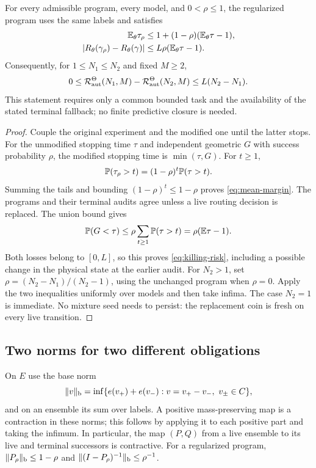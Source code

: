 \begin{lemma}\label{lem:margin}
For every admissible program, every model, and $0<\rho\le1$, the regularized program uses the same labels and satisfies
\begin{align}
 \mathbb E_\theta\tau_\rho
 &\le1+(1-\rho)(\mathbb E_\theta\tau-1),\label{eq:mean-margin}\\
 |R_\theta(\gamma_\rho)-R_\theta(\gamma)|
 &\le L\rho(\mathbb E_\theta\tau-1).\label{eq:killing-risk}
\end{align}
Consequently, for $1\le N_1\le N_2$ and fixed $M\ge2$,
\begin{equation}\label{eq:budget-lipschitz}
 0\le\mathcal R_{\mathrm{aut}}^\Theta(N_1,M)-\mathcal R_{\mathrm{aut}}^\Theta(N_2,M)
       \le L(N_2-N_1).
\end{equation}
This statement requires only a common bounded task and the availability of the stated terminal fallback; no finite predictive closure is needed.
\end{lemma}
\begin{proof}
Couple the original experiment and the modified one until the latter stops. For the unmodified stopping time $\tau$ and independent geometric $G$ with success probability $\rho$, the modified stopping time is $\min(\tau,G)$. For $t\ge1$,
\[
 \mathbb P(\tau_\rho>t)=(1-\rho)^t\mathbb P(\tau>t).
\]
Summing the tails and bounding $(1-\rho)^t\le1-\rho$ proves \eqref{eq:mean-margin}. The programs and their terminal audits agree unless a live routing decision is replaced. The union bound gives
\[
 \mathbb P(G<\tau)\le\rho\sum_{t\ge1}\mathbb P(\tau>t)
                  =\rho(\mathbb E\tau-1).
\]
Both losses belong to $[0,L]$, so this proves \eqref{eq:killing-risk}, including a possible change in the physical state at the earlier audit. For $N_2>1$, set $\rho=(N_2-N_1)/(N_2-1)$, using the unchanged program when $\rho=0$. Apply the two inequalities uniformly over models and then take infima. The case $N_2=1$ is immediate. No mixture seed needs to persist: the replacement coin is fresh on every live transition.
\end{proof}

\subsection{Two norms for two different obligations}
On $E$ use the base norm
\[
 \lVert v\rVert_{\mathrm b}=\inf\{e(v_+)+e(v_-):v=v_+-v_-,\ v_\pm\in C\},
\]
and on an ensemble its sum over labels. A positive mass-preserving map is a contraction in these norms; this follows by applying it to each positive part and taking the infimum. In particular, the map $(P,Q)$ from a live ensemble to its live and terminal successors is contractive. For a regularized program, $\lVert P_\rho\rVert_{\mathrm b}\le1-\rho$ and $\lVert (I-P_\rho)^{-1}\rVert_{\mathrm b}\le\rho^{-1}$.

